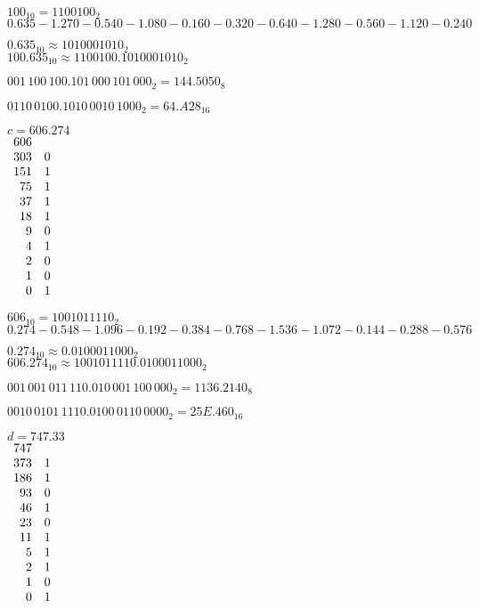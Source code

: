 \documentclass[a4paper,12pt]{article}
\begin{document}
$100_{10} = 1100100_2$
\\

$0.635 - 1.270 - 0.540 - 1.080 - 0.160 - 0.320 - 0.640 - 1.280 - 0.560 - 1.120 - 0.240$

$0.635_{10} \approx 1010001010_2$
\\

$100.635_{10} \approx 1100100.1010001010_2$

$001 \, 100 \, 100.101 \, 000 \, 101 \, 000_2 = 144.5050_8$

$0110 \, 0100.1010 \, 0010 \, 1000_2 = 64.A28_{16}$

\newpage





$c = 606.274$
\\

$\begin{array}{r l}
606 & \\
303 & 0 \\
151 & 1 \\
75 & 1 \\
37 & 1 \\
18 & 1 \\
9 & 0 \\
4 & 1 \\
2 & 0 \\
1 & 0 \\
0 & 1 \\
\end{array}$

$606_{10} = 1001011110_2$
\\

$0.274 - 0.548 - 1.096 - 0.192 - 0.384 - 0.768 - 1.536 - 1.072 - 0.144 - 0.288 - 0.576$

$0.274_{10} \approx 0.0100011000_2$
\\

$606.274_{10} \approx 1001011110.0100011000_2$

$001 \, 001 \, 011 \, 110.010 \, 001 \, 100 \, 000_2 = 1136.2140_8$

$0010 \, 0101 \, 1110.0100 \, 0110 \, 0000_2 = 25E.460_{16}$

\newpage




$d = 747.33$
\\

$\begin{array}{r l}
747 & \\
373 & 1 \\
186 & 1 \\
93 & 0 \\
46 & 1 \\
23 & 0 \\
11 & 1 \\
5 & 1 \\
2 & 1 \\
1 & 0 \\
0 & 1 \\
\end{array}$
\end{document}
